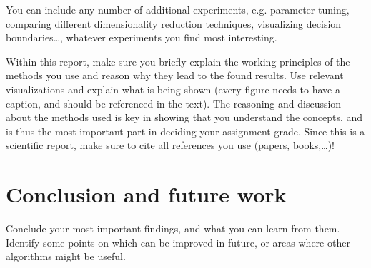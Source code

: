 \documentclass[runningheads]{llncs}
\begin{document}
You can include any number of additional experiments, e.g. parameter tuning, comparing different dimensionality reduction techniques, visualizing decision boundaries\dots, whatever experiments you find most interesting. 

Within this report, make sure you briefly explain the working principles of the methods you use and reason why they lead to the found results. Use relevant visualizations and explain what is being shown (every figure needs to have a caption, and should be referenced in the text). The reasoning and discussion about the methods used is key in showing that you understand the concepts, and is thus the most important part in deciding your assignment grade. Since this is a scientific report, make sure to cite all references you use (papers, books,\dots)!

\section{Conclusion and future work}
Conclude your most important findings, and what you can learn from them. Identify some points on which can be improved in future, or areas where other algorithms might be useful. 




\end{document}
